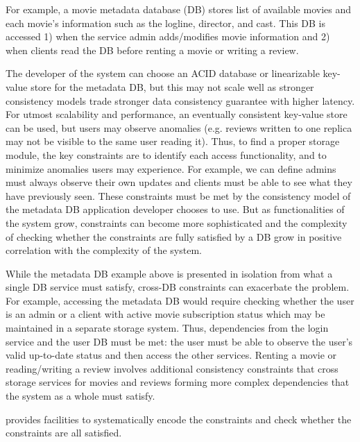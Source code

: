 For example, a movie metadata database (DB) stores list of
available movies and each movie's information such as the
logline, director, and cast. This DB is accessed 1) when
the service admin adds/modifies movie information and
2) when clients read the DB before renting a movie
or writing a review.

The developer of the system can choose an ACID database or linearizable
key-value store for the metadata DB, but this may not scale well as
stronger consistency models trade stronger data consistency guarantee with higher latency.
For utmost scalability and performance, an eventually consistent
key-value store can be used, but users may observe anomalies (e.g. reviews
written to one replica may not be visible to the same user reading it).
Thus, to find a proper storage module, the key constraints are to identify
each access functionality, and to minimize anomalies users may experience.
For example, we can define admins must always observe their own
updates and clients must be able
to see what they have previously seen. These constraints
must be met by the consistency model of the metadata DB application developer chooses to use.
But as functionalities of the system grow, constraints can become
more sophisticated and
the complexity of checking whether the constraints are fully satisfied by a DB
grow in positive correlation with the complexity of the system.

While the metadata DB example above is presented in isolation from
what a single DB service must satisfy, cross-DB constraints can exacerbate
the problem. For example, accessing the metadata DB would require
checking whether the user is an admin or a client with active movie subscription
status which may be maintained in a separate storage system. Thus,
dependencies from the login service and the user DB must be met:
the user must be able to observe the user's valid up-to-date status
and then access the other services. Renting a movie or reading/writing a
review involves additional consistency constraints that cross storage services
for movies and reviews forming more complex dependencies that the system as a
whole must satisfy.

\sysname{} provides facilities to systematically encode the constraints
and check whether the constraints are all satisfied.

